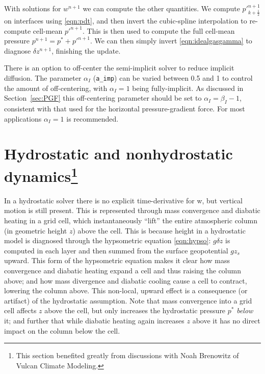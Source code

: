 \documentclass[10pt,letterpaper,margin=1in]{memoir}
\newcommand{\half}{\frac{1}{2}}
\begin{document}
With solutions for $w^{n+1}$ we can compute the other quantities. We compute $p'^{n+1}_{k+\half}$ on interfaces using \eqref{eqn:pdt}, and then invert the cubic-spline interpolation to re-compute cell-mean $p'^{n+1}$. This is then used to compute the full cell-mean pressure $p^{n+1} = p^* + p'^{n+1}$. We can then simply invert \eqref{eqn:idealgasgamma} to diagnose $\delta z^{n+1}$, finishing the update.

There is an option to off-center the semi-implicit solver to reduce implicit diffusion. The parameter $\alpha_I$ (\texttt{a_imp}) can be varied between 0.5 and 1 to control the amount of off-centering, with $\alpha_I = 1$ being fully-implicit. As discussed in Section~\ref{sec:PGF} this off-centering parameter should be set to $\alpha_I = \beta_I - 1$, consistent with that used for the horizontal pressure-gradient force. For most applications $\alpha_I = 1$ is recommended. 



\section{Hydrostatic and nonhydrostatic dynamics\footnote{This section benefited greatly from discussions with Noah Brenowitz of Vulcan Climate Modeling.}} \label{sec:hydrononhydro}

In a hydrostatic solver there is no explicit time-derivative for w, but vertical motion is still present. This is represented through mass convergence and diabatic heating in a grid cell, which instantaneously ``lift'' the entire atmospheric column (in geometric height $z$) above the cell. This is because height in a hydrostatic model is diagnosed through the hypsometric equation \eqref{eqn:hypso}: $g\delta z$ is computed in each layer and then summed from the surface geopotential $gz_s$ upward. This form of the hypsometric equation makes it clear how mass convergence and diabatic heating expand a cell and thus raising the column above; and how mass divergence and diabatic cooling cause a cell to contract, lowering the column above. This non-local, upward effect is a consequence (or artifact) of the hydrostatic assumption. Note that mass convergence into a grid cell affects $z$ above the cell, but only increases the hydrostatic pressure $p^*$ \textit{below} it; and further that while diabatic heating again increases $z$ above it has no direct impact on the column below the cell. 
\end{document}
